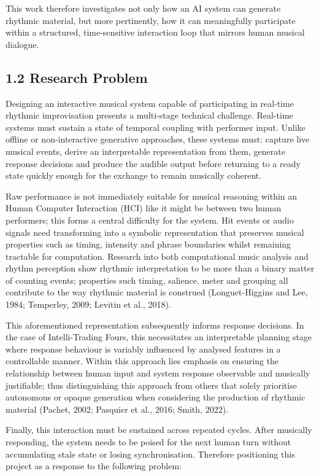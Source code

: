This work therefore investigates not only how an AI system can generate
rhythmic material, but more pertinently, how it can meaningfully
participate within a structured, time-sensitive interaction loop that
mirrors human musical dialogue.

\subsection{1.2 Research Problem}\label{research-problem}

Designing an interactive musical system capable of participating in
real-time rhythmic improvisation presents a multi-stage technical
challenge. Real-time systems must sustain a state of temporal coupling
with performer input. Unlike offline or non-interactive generative
approaches, these systems must: capture live musical events, derive an
interpretable representation from them, generate response decisions and
produce the audible output before returning to a ready state quickly
enough for the exchange to remain musically coherent.

Raw performance is not immediately suitable for musical reasoning within
an Human Computer Interaction (HCI) like it might be between two human
performers; this forms a central difficulty for the system. Hit events
or audio signals need transforming into a symbolic representation that
preserves musical properties such as timing, intensity and phrase
boundaries whilst remaining tractable for computation. Research into
both computational music analysis and rhythm perception show rhythmic
interpretation to be more than a binary matter of counting events;
properties such timing, salience, meter and grouping all contribute to
the way rhythmic material is construed (Longuet-Higgins and Lee, 1984;
Temperley, 2009; Levitin et al., 2018).

This aforementioned representation subsequently informs response
decisions. In the case of Intelli-Trading Fours, this necessitates an
interpretable planning stage where response behaviour is variably
influenced by analysed features in a controllable manner. Within this
approach lies emphasis on ensuring the relationship between human input
and system response observable and musically justifiable; thus
distinguishing this approach from others that solely prioritise
autonomous or opaque generation when considering the production of
rhythmic material (Pachet, 2002; Pasquier et al., 2016; Smith, 2022).

Finally, this interaction must be sustained across repeated cycles.
After musically responding, the system needs to be poised for the next
human turn without accumulating stale state or losing synchronisation.
Therefore positioning this project as a response to the following
problem:

